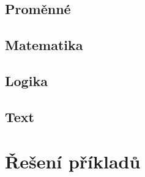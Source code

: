 \subsection*{Proměnné }
\begin{itemize}
	\blockVariableCreate
	\blockVariableChange
	\blockVariableGet
	\blockVariableSet
\end{itemize}

\subsection*{Matematika }
\begin{itemize}
	\blockMathOperation
	\blockMathTest
	\blockMathValue
	\blockMathConstant
	\blockMathRandom
\end{itemize}

\subsection*{Logika }
\begin{itemize}
	\blockLogicTrue
	\blockLogicFalse
	\blockLogicIf
	\blockLogicIfElse
	\blockLogicComparison
	\blockLogicOperator
\end{itemize}

\subsection*{Text }
\begin{itemize}
	\blockString
	\blockDisplayPrint
	\blockDisplayClear
\end{itemize}

\newpage

\section{Řešení příkladů}\label{cha:sol}

\printsolutions

\newpage

\nocite{*}
\printbibliography[title={Seznam použitých a doporučených zdrojů}]

